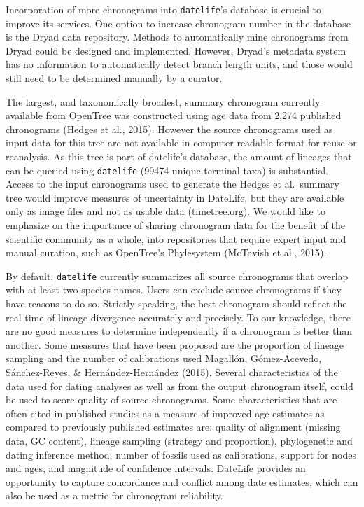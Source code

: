 \documentclass[
  english,
  man]{apa6}
\begin{document}
Incorporation of more chronograms into \texttt{datelife}'s database is crucial to improve its services. One option to increase chronogram number in the database is the Dryad data repository. Methods to automatically mine chronograms from Dryad could be designed and implemented. However, Dryad's metadata system has no information to automatically detect branch length units, and those would still need to be determined manually by a curator.

The largest, and taxonomically broadest, summary chronogram currently available from OpenTree
was constructed using age data from 2,274 published chronograms (Hedges et al., 2015). However the source chronograms used as input data for this tree are not available in computer readable format for reuse or reanalysis. As this tree is part of datelife's database, the amount of lineages that can be queried using \texttt{datelife} (99474 unique terminal taxa) is substantial.
Access to the input chronograms used to generate the Hedges et al.~summary tree would improve measures of uncertainty in DateLife, but they are available only as image files and not as usable data (timetree.org).
We would like to emphasize on the importance of sharing chronogram data for the benefit of the scientific community as a whole, into repositories that require expert input and manual curation, such as OpenTree's Phylesystem (McTavish et al., 2015).

By default, \texttt{datelife} currently summarizes all source chronograms that overlap with at least two species names. Users can exclude source chronograms if they have reasons to do so.
Strictly speaking, the best chronogram should reflect the real time of lineage divergence accurately and precisely.
To our knowledge, there are no good measures to determine independently if a chronogram is better than another.
Some measures that have been proposed are the proportion of lineage sampling and the number of calibrations used Magallón, Gómez-Acevedo, Sánchez-Reyes, \& Hernández-Hernández (2015).
Several characteristics of the data used for dating analyses as well as from the output chronogram itself, could be used to score quality of source chronograms.
Some characteristics that are often cited in published studies as a measure of improved age estimates as compared to previously published estimates are: quality of alignment (missing data, GC content), lineage sampling (strategy and proportion), phylogenetic and dating inference method, number of fossils used as calibrations, support for nodes and ages, and magnitude of confidence intervals.
DateLife provides an opportunity to capture concordance and conflict among date estimates, which can also be used as a metric for chronogram reliability.
\end{document}
